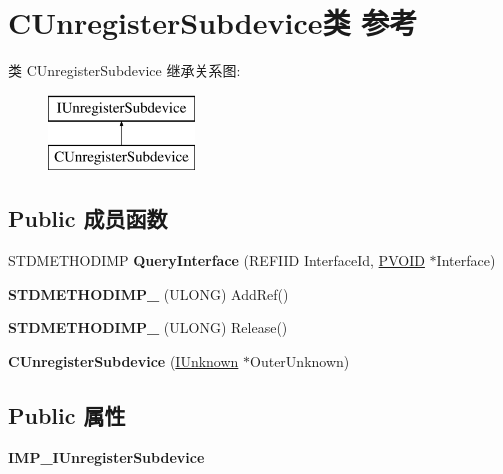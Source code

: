 \hypertarget{class_c_unregister_subdevice}{}\section{C\+Unregister\+Subdevice类 参考}
\label{class_c_unregister_subdevice}
类 C\+Unregister\+Subdevice 继承关系图\+:\begin{figure}[H]
\begin{center}
\leavevmode
\includegraphics[height=2.000000cm]{class_c_unregister_subdevice}
\end{center}
\end{figure}
\subsection*{Public 成员函数}
\begin{DoxyCompactItemize}
\item 
\mbox{\label{class_c_unregister_subdevice_aabb1ae418b0243d902f477da7ef9d735}} 
S\+T\+D\+M\+E\+T\+H\+O\+D\+I\+MP {\bfseries Query\+Interface} (R\+E\+F\+I\+ID Interface\+Id, \hyperlink{interfacevoid}{P\+V\+O\+ID} $\ast$Interface)
\item 
\mbox{\label{class_c_unregister_subdevice_a0b5eae28e0b0722d8eb986e063e35022}} 
{\bfseries S\+T\+D\+M\+E\+T\+H\+O\+D\+I\+M\+P\+\_\+} (U\+L\+O\+NG) Add\+Ref()
\item 
\mbox{\label{class_c_unregister_subdevice_a04e6cd81d1e27d73867d1c193c0db19c}} 
{\bfseries S\+T\+D\+M\+E\+T\+H\+O\+D\+I\+M\+P\+\_\+} (U\+L\+O\+NG) Release()
\item 
\mbox{\label{class_c_unregister_subdevice_a3ea95104f938469985bfbf970a0b9a6b}} 
{\bfseries C\+Unregister\+Subdevice} (\hyperlink{interface_i_unknown}{I\+Unknown} $\ast$Outer\+Unknown)
\end{DoxyCompactItemize}
\subsection*{Public 属性}
\begin{DoxyCompactItemize}
\item 
\mbox{\label{class_c_unregister_subdevice_a128c5cf23c6bec8089874cf67830756e}} 
{\bfseries I\+M\+P\+\_\+\+I\+Unregister\+Subdevice}
\end{DoxyCompactItemize}
